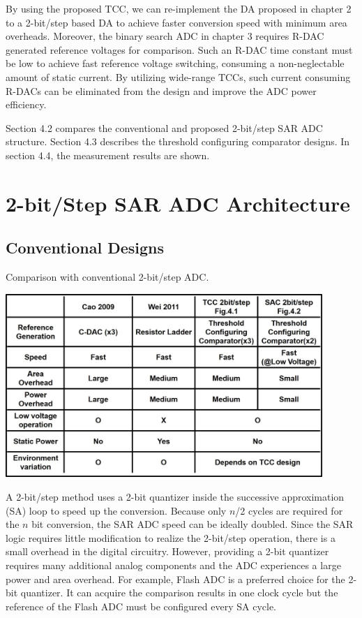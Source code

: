By using the proposed TCC, we can re-implement the DA proposed in chapter 2 to a 2-bit/step based DA to achieve faster conversion speed with minimum area overheads. 
Moreover, the binary search ADC in chapter 3 requires R-DAC generated reference voltages for comparison. Such an R-DAC time constant must be low to achieve fast reference voltage switching, consuming a non-neglectable amount of static current. By utilizing wide-range TCCs, such current consuming R-DACs can be eliminated from the design and improve the ADC power efficiency.

Section 4.2 compares the conventional and proposed 2-bit/step SAR ADC structure. Section 4.3 describes the threshold configuring comparator designs. In section 4.4, the measurement results are shown.

\section{2-bit/Step SAR ADC Architecture}
\subsection{Conventional Designs}

\begin{table}
\centering
\caption{Comparison with conventional 2-bit/step ADC.}
  \includegraphics[width=0.9\textwidth]{figure/chap4/table1.jpg}
  \label{tab-4-1}
\end{table}

A 2-bit/step method uses a 2-bit quantizer inside the successive approximation (SA) loop to speed up the conversion. Because only $n$/2 cycles are required for the $n$ bit conversion, the SAR ADC speed can be ideally doubled. Since the SAR logic requires little modification to realize the 2-bit/step operation, there is a small overhead in the digital circuitry. However, providing a 2-bit quantizer requires many additional analog components and the ADC experiences a large power and area overhead. For example, Flash ADC is a preferred choice for the 2-bit quantizer. It can acquire the comparison results in one clock cycle but the reference of the Flash ADC must be configured every SA cycle. 

